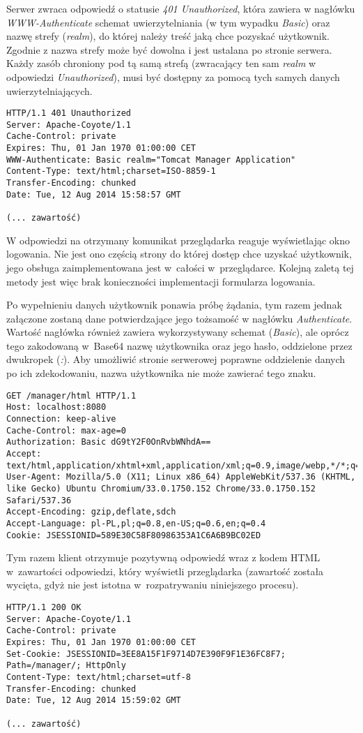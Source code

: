 \documentclass[11pt]{aghdpl}
\begin{document}
Serwer zwraca odpowiedź o statusie \emph{401 Unauthorized}, która zawiera w nagłówku \emph{WWW-Authenticate} schemat uwierzytelniania (w tym wypadku \emph{Basic}) oraz nazwę strefy (\emph{realm}), do której należy treść jaką chce pozyskać użytkownik. Zgodnie z \cite{BDA99} nazwa strefy może być dowolna i jest ustalana po stronie serwera. Każdy zasób chroniony pod tą samą strefą (zwracający ten sam \emph{realm} w odpowiedzi \emph{Unauthorized}), musi być dostępny za pomocą tych samych danych uwierzytelniających.
\begin{lstlisting}
HTTP/1.1 401 Unauthorized
Server: Apache-Coyote/1.1
Cache-Control: private
Expires: Thu, 01 Jan 1970 01:00:00 CET
WWW-Authenticate: Basic realm="Tomcat Manager Application"
Content-Type: text/html;charset=ISO-8859-1
Transfer-Encoding: chunked
Date: Tue, 12 Aug 2014 15:58:57 GMT

(... zawartość)
\end{lstlisting}

W odpowiedzi na otrzymany komunikat przeglądarka reaguje wyświetlając okno logowania. Nie jest ono częścią strony do której dostęp chce uzyskać użytkownik, jego obsługa zaimplementowana jest w~całości w~przeglądarce. Kolejną zaletą tej metody jest więc brak konieczności implementacji formularza logowania.

Po wypełnieniu danych użytkownik ponawia próbę żądania, tym razem jednak załączone zostaną dane potwierdzające jego tożsamość w nagłówku \emph{Authenticate}. Wartość nagłówka również zawiera wykorzystywany schemat (\emph{Basic}), ale oprócz tego zakodowaną w~Base64 nazwę użytkownika oraz jego hasło, oddzielone przez dwukropek (\emph{:}). Aby umożliwić stronie serwerowej poprawne oddzielenie danych po ich zdekodowaniu, nazwa użytkownika nie może zawierać tego znaku.
\begin{lstlisting}
GET /manager/html HTTP/1.1
Host: localhost:8080
Connection: keep-alive
Cache-Control: max-age=0
Authorization: Basic dG9tY2F0OnRvbWNhdA==
Accept: text/html,application/xhtml+xml,application/xml;q=0.9,image/webp,*/*;q=0.8
User-Agent: Mozilla/5.0 (X11; Linux x86_64) AppleWebKit/537.36 (KHTML, like Gecko) Ubuntu Chromium/33.0.1750.152 Chrome/33.0.1750.152 Safari/537.36
Accept-Encoding: gzip,deflate,sdch
Accept-Language: pl-PL,pl;q=0.8,en-US;q=0.6,en;q=0.4
Cookie: JSESSIONID=589E30C58F80986353A1C6A6B9BC02ED
\end{lstlisting}

Tym razem klient otrzymuje pozytywną odpowiedź wraz z kodem HTML w~zawartości odpowiedzi, który wyświetli przeglądarka (zawartość została wycięta, gdyż nie jest istotna w~rozpatrywaniu niniejszego procesu).
\begin{lstlisting}
HTTP/1.1 200 OK
Server: Apache-Coyote/1.1
Cache-Control: private
Expires: Thu, 01 Jan 1970 01:00:00 CET
Set-Cookie: JSESSIONID=3EE8A15F1F9714D7E390F9F1E36FC8F7; Path=/manager/; HttpOnly
Content-Type: text/html;charset=utf-8
Transfer-Encoding: chunked
Date: Tue, 12 Aug 2014 15:59:02 GMT

(... zawartość)
\end{lstlisting}
\end{document}
